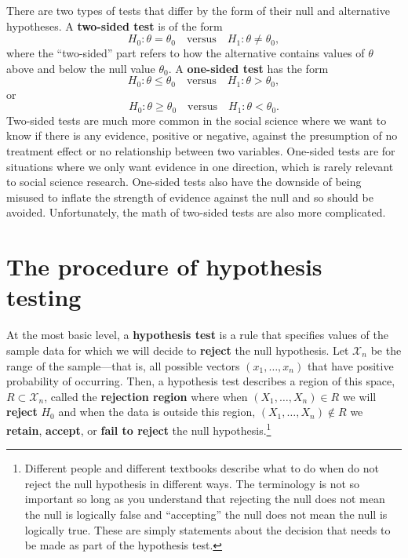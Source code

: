 \documentclass[
  letterpaper,
  DIV=11,
  numbers=noendperiod]{scrreprt}
\theoremstyle{definition}
\theoremstyle{plain}
\theoremstyle{definition}
\theoremstyle{remark}
\begin{document}
There are two types of tests that differ by the form of their null and
alternative hypotheses. A \textbf{two-sided test} is of the form \[
H_0: \theta = \theta_0 \quad\text{versus}\quad H_1: \theta \neq \theta_0,
\] where the ``two-sided'' part refers to how the alternative contains
values of \(\theta\) above and below the null value \(\theta_0\). A
\textbf{one-sided test} has the form \[
H_0: \theta \leq \theta_0 \quad\text{versus}\quad H_1: \theta > \theta_0,
\] or \[
H_0: \theta \geq \theta_0 \quad\text{versus}\quad H_1: \theta < \theta_0.
\] Two-sided tests are much more common in the social science where we
want to know if there is any evidence, positive or negative, against the
presumption of no treatment effect or no relationship between two
variables. One-sided tests are for situations where we only want
evidence in one direction, which is rarely relevant to social science
research. One-sided tests also have the downside of being misused to
inflate the strength of evidence against the null and so should be
avoided. Unfortunately, the math of two-sided tests are also more
complicated.

\hypertarget{the-procedure-of-hypothesis-testing}{%
\section{The procedure of hypothesis
testing}\label{the-procedure-of-hypothesis-testing}}

At the most basic level, a \textbf{hypothesis test} is a rule that
specifies values of the sample data for which we will decide to
\textbf{reject} the null hypothesis. Let \(\mathcal{X}_n\) be the range
of the sample---that is, all possible vectors \((x_1, \ldots, x_n)\)
that have positive probability of occurring. Then, a hypothesis test
describes a region of this space, \(R \subset \mathcal{X}_n\), called
the \textbf{rejection region} where when \((X_1, \ldots, X_n) \in R\) we
will \textbf{reject} \(H_0\) and when the data is outside this region,
\((X_1, \ldots, X_n) \notin R\) we \textbf{retain}, \textbf{accept}, or
\textbf{fail to reject} the null hypothesis.\footnote{Different people
  and different textbooks describe what to do when do not reject the
  null hypothesis in different ways. The terminology is not so important
  so long as you understand that rejecting the null does not mean the
  null is logically false and ``accepting'' the null does not mean the
  null is logically true. These are simply statements about the decision
  that needs to be made as part of the hypothesis test.}
\end{document}
